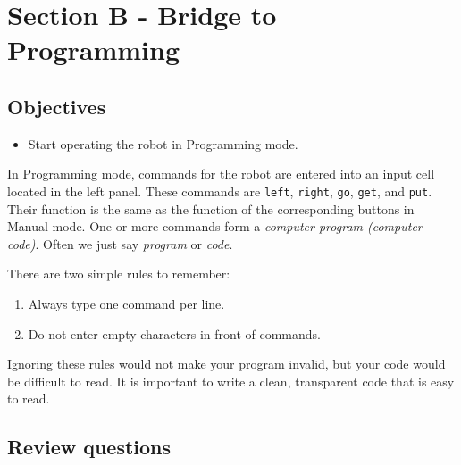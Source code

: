 
\section{Section B - Bridge to Programming} \label{sec:bridge}

\subsection{Objectives} 
 
\begin{itemize}
\item Start operating the robot in Programming mode.
\end{itemize}
In Programming mode, commands for the robot are entered into an input cell located in the left panel.
These commands are {\tt left}, {\tt right}, {\tt go}, {\tt get}, and {\tt put}.
Their function is the same as the function of the corresponding buttons in Manual mode.
One or more commands form a {\em computer program (computer code)}. Often 
we just say {\em program} or {\em code}.

There are two simple rules to remember:
\begin{enumerate}
\item Always type one command per line.
\item Do not enter empty characters in front of commands. 
\end{enumerate}
Ignoring these rules would not make your program invalid, but your code would be 
difficult to read. It is important to write a clean, transparent code that is easy to read. 

\subsection{Review questions}

